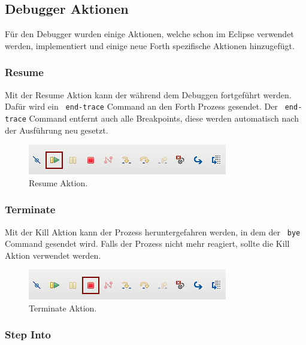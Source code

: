 \subsection{Debugger Aktionen}

Für den Debugger wurden einige Aktionen, welche schon im Eclipse verwendet werden, implementiert und einige neue Forth spezifische Aktionen hinzugefügt.

\subsubsection{Resume}

Mit der Resume Aktion kann der während dem Debuggen fortgeführt werden. Dafür wird ein \verb! end-trace! Command an den Forth Prozess gesendet. Der \verb! end-trace! Command entfernt auch alle Breakpoints, diese werden automatisch nach der Ausführung neu gesetzt. 

\begin{figure}[H]
	\centering
		\includegraphics[scale=1]{debugger/resume.png}
		\caption{Resume Aktion.}
		\label{fig:extensionpoint}
\end{figure}

\subsubsection{Terminate}

Mit der Kill Aktion kann der Prozess heruntergefahren werden, in dem der \verb! bye! Command gesendet wird. Falls der Prozess nicht mehr reagiert, sollte die Kill Aktion verwendet werden.

\begin{figure}[H]
	\centering
		\includegraphics[scale=1]{debugger/terminate.png}
		\caption{Terminate Aktion.}
		\label{fig:extensionpoint}
\end{figure}

\subsubsection{Step Into}

